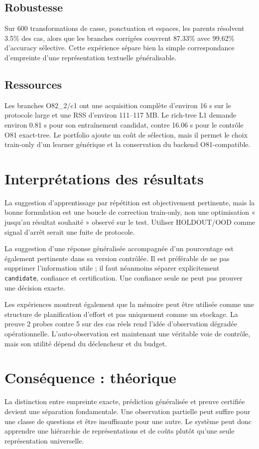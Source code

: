 \documentclass[11pt,a4paper]{report}
\begin{document}
\section{Robustesse}
Sur 600 transformations de casse, ponctuation et espaces, les parents résolvent 3.5\% des cas, alors que les branches corrigées couvrent 87.33\% avec 99.62\% d'accuracy sélective. Cette expérience sépare bien la simple correspondance d'empreinte d'une représentation textuelle généralisable.

\section{Ressources}
Les branches O82\_2/c1 ont une acquisition complète d'environ 16 s sur le protocole large et une RSS d'environ 111--117 MB. Le rich-tree L1 demande environ 0.81 s pour son entraînement candidat, contre 16.06 s pour le contrôle O81 exact-tree. Le portfolio ajoute un coût de sélection, mais il permet le choix train-only d'un learner générique et la conservation du backend O81-compatible.

\chapter{Interprétations des résultats}
La suggestion d'apprentissage par répétition est objectivement pertinente, mais la bonne formulation est une boucle de correction train-only, non une optimisation « jusqu'au résultat souhaité » observé sur le test. Utiliser HOLDOUT/OOD comme signal d'arrêt serait une fuite de protocole.

La suggestion d'une réponse généralisée accompagnée d'un pourcentage est également pertinente dans sa version contrôlée. Il est préférable de ne pas supprimer l'information utile ; il faut néanmoins séparer explicitement \texttt{candidate}, confiance et certification. Une confiance seule ne peut pas prouver une décision exacte.

Les expériences montrent également que la mémoire peut être utilisée comme une structure de planification d'effort et pas uniquement comme un stockage. La preuve 2 probes contre 5 sur des cas réels rend l'idée d'observation dégradée opérationnelle. L'auto-observation est maintenant une véritable voie de contrôle, mais son utilité dépend du déclencheur et du budget.

\chapter{Conséquence : théorique}
La distinction entre empreinte exacte, prédiction généralisée et preuve certifiée devient une séparation fondamentale. Une observation partielle peut suffire pour une classe de questions et être insuffisante pour une autre. Le système peut donc apprendre une hiérarchie de représentations et de coûts plutôt qu'une seule représentation universelle.
\end{document}
